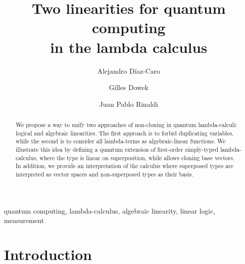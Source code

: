\documentclass[preprint]{elsarticle}
\begin{document}
\begin{frontmatter}

  \title{Two linearities for quantum computing\\ in the lambda
    calculus}  

  \author[CONICET,UNQ]{Alejandro D\'iaz-Caro}

  \author[ENS]{Gilles Dowek} 

  \author[UNR]{Juan Pablo Rinaldi} 

  \address[CONICET]{CONICET-UBA, ICC,
    Pabell\'on 1, Ciudad Universitaria, Buenos Aires, Argentina.}
  \address[UNQ]{Universidad Nacional de Quilmes, R.~S\'aenz Pe\~na
    352, Bernal, BA, Argentina}
  \address[ENS]{Inria, LSV, ENS Paris-Saclay, 61, avenue du Pr\'esident Wilson,
    Cachan, France}
  \address[UNR]{Universidad Nacional de Rosario, Pellegrini 250, Rosario, SF, Argentina}

\begin{abstract}
  We propose a way to unify two approaches of non-cloning in quantum
  lambda-calculi: logical and algebraic linearities. The first approach is to forbid duplicating variables, while
  the second is to consider all lambda-terms as algebraic-linear functions. We
  illustrate this idea by defining a quantum extension of first-order
  simply-typed lambda-calculus, where the type is linear on superposition, while
  allows cloning base vectors. In addition, we provide an interpretation of the
  calculus where superposed types are interpreted as vector spaces and
  non-superposed types as their basis.
\end{abstract}

\begin{keyword}
  quantum computing, lambda-calculus, algebraic linearity, linear logic,
  measurement
\end{keyword}

\end{frontmatter}
\section{Introduction}
\end{document}
